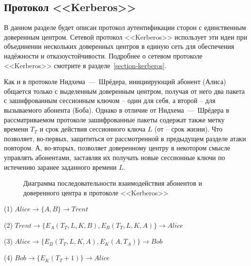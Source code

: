 \subsection{Протокол <<Kerberos>>}\label{section-protocols-kerberos}

В данном разделе будет описан протокол аутентификации сторон с единственным доверенным центром. Сетевой протокол <<Kerberos>> использует эти идеи при объединении нескольких доверенных центров в единую сеть для обеспечения надёжности и отказоустойчивости. Подробнее о сетевом протоколе <<Kerberos>> смотрите в разделе~\ref{section-kerberos}.

Как и в протоколе Нидхема~---~Шрёдера, инициирующий абонент (Алиса) общается только с выделенным доверенным центром, получая от него два пакета с зашифрованным сессионным ключом -- один для себя, а второй -- для вызываемого абонента (Боба). Однако в отличие от Нидхема~---~Шрёдера в рассматриваемом протоколе зашифрованные пакеты содержат также метку времени $T_T$ и срок действия сессионного ключа $L$ (от  -- срок жизни). Что позволяет, во-первых, защититься от рассмотренной в предыдущем разделе атаки повтором. А, во-вторых, позволяет доверенному центру в некотором смысле управлять абонентами, заставляя их получать новые сессионные ключи по истечению заранее заданного времени $L$.

\begin{figure}
	\centering
	\begin{sequencediagram}
		
	\end{sequencediagram}
	\caption{Диаграмма последовательности взаимодействия абонентов и доверенного центра в протоколе <<Kerberos>>\label{fig:key_distribution-kerberos}}
\end{figure}

\begin{protocol}
	\item[(1)] $ Alice \to \{ A, B \} \to Trent $
	\item[(2)] $ Trent \to \{ E_A \left( T_T, L, K, B \right), E_B \left( T_T, L, K, A \right) \} \to Alice $
	\item[(3)] $ Alice \to \{ E_B \left( T_T, L, K, A \right), E_K \left( A, T_A \right) \} \to Bob $
	\item[(4)] $ Bob \to \{ E_K \left( T_T + 1 \right) \} \to Alice $
\end{protocol}

